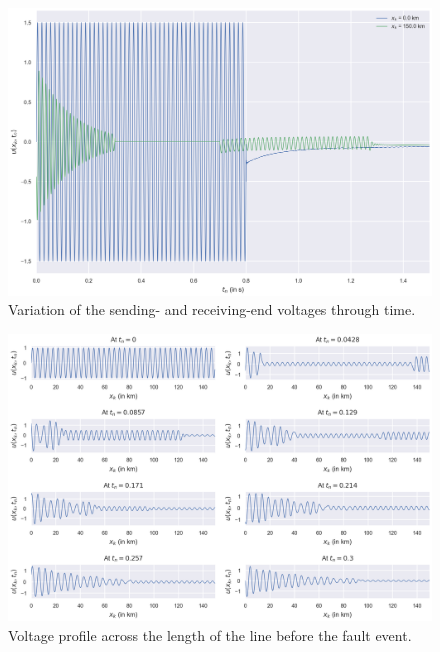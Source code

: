 \documentclass{article}
\begin{document}
\begin{figure}[h!]
	\centering
	\includegraphics[scale=0.7]{simulating a faulted bus - sending- and receiving-end voltages.png}
	\caption{Variation of the sending- and receiving-end voltages through time.}
	\label{fig: Simulating a Faulted Bus results: Sending- and receiving-end voltages}
\end{figure}

\begin{figure}[t!]
	\centering
	\includegraphics[scale=0.7]{simulating a faulted bus - voltage profiles at pre-fault.png}
	\caption{Voltage profile across the length of the line before the fault event.}
	\label{fig: Simulating a Faulted Bus results: Voltage profiles at pre-fault}
\end{figure}
\end{document}
